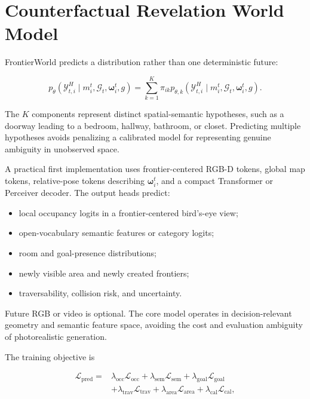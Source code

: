 \documentclass[10pt,twocolumn]{article}
\newcommand{\Global}{\mathcal{G}}
\newcommand{\Reveal}{\mathcal{Y}}
\newcommand{\Option}{\boldsymbol{\omega}}
\newcommand{\Loss}{\mathcal{L}}
\begin{document}
\section{Counterfactual Revelation World Model}

FrontierWorld predicts a distribution rather than one deterministic future:

\begin{equation}
p_\theta
\left(
\Reveal_{t,i}^{H}
\mid
m_i^t,\Global_t,\Option_i^t,g
\right)
=
\sum_{k=1}^{K}
\pi_{ik}
p_{\theta,k}
\left(
\Reveal_{t,i}^{H}
\mid
m_i^t,\Global_t,\Option_i^t,g
\right).
\label{eq:mixture}
\end{equation}

The \(K\) components represent distinct spatial-semantic hypotheses, such as a
doorway leading to a bedroom, hallway, bathroom, or closet. Predicting multiple
hypotheses avoids penalizing a calibrated model for representing genuine
ambiguity in unobserved space.

A practical first implementation uses frontier-centered RGB-D tokens, global
map tokens, relative-pose tokens describing \(\Option_i^t\), and a compact
Transformer or Perceiver decoder. The output heads predict:

\begin{itemize}
    \item local occupancy logits in a frontier-centered bird's-eye view;
    \item open-vocabulary semantic features or category logits;
    \item room and goal-presence distributions;
    \item newly visible area and newly created frontiers;
    \item traversability, collision risk, and uncertainty.
\end{itemize}

Future RGB or video is optional. The core model operates in decision-relevant
geometry and semantic feature space, avoiding the cost and evaluation
ambiguity of photorealistic generation.

The training objective is

\begin{align}
\Loss_{\mathrm{pred}}
={}&
\lambda_{\mathrm{occ}}\Loss_{\mathrm{occ}}
+
\lambda_{\mathrm{sem}}\Loss_{\mathrm{sem}}
+
\lambda_{\mathrm{goal}}\Loss_{\mathrm{goal}}
\nonumber\\
&+
\lambda_{\mathrm{trav}}\Loss_{\mathrm{trav}}
+
\lambda_{\mathrm{area}}\Loss_{\mathrm{area}}
+
\lambda_{\mathrm{cal}}\Loss_{\mathrm{cal}},
\end{align}
\end{document}

